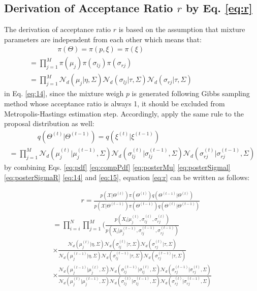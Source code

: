 \documentclass[conference]{IEEEtran}
\begin{document}
\subsection{Derivation of Acceptance Ratio $r$ by Eq. \eqref{eq:r}}
The derivation of acceptance ratio $r$ is based on the assumption that mixture parameters are independent from each other which means that:
\bigskip
\begin{multline}
\qquad\qquad\pi(\Theta) = \pi(p,\xi) = \pi(\xi) \\
= \prod_{j=1}^M\pi(\mu_j)\pi(\sigma_{lj})\pi(\sigma_{rj}) \qquad\qquad\qquad\qquad\qquad\\
= \prod_{j=1}^M\mathcal{N}_d(\mu_j|\eta,\Sigma)\mathcal{N}_d(\sigma_{lj}|\tau,\Sigma)\mathcal{N}_d(\sigma_{rj}|\tau,\Sigma)\qquad\qquad\qquad
\label{eq:14}
\end{multline}
in Eq. \eqref{eq:14}, since the mixture weigh $p$ is generated following Gibbs sampling method whose acceptance ratio is always 1, it should be excluded from Metropolis-Hastings estimation step. Accordingly, apply the same rule to the proposal distribution as well:
\begin{multline}
\qquad\qquad q(\Theta^{(t)}|\Theta^{(t-1)}) = q(\xi^{(t)}|\xi^{(t-1)}) \\
= \prod_{j=1}^M\mathcal{N}_d(\mu_j^{(t)}|\mu_j^{(t-1)},\Sigma)\mathcal{N}_d(\sigma_{lj}^{(t)}|\sigma_{lj}^{(t-1)},\Sigma)\mathcal{N}_d(\sigma_{rj}^{(t)}|\sigma_{rj}^{(t-1)},\Sigma)
\label{eq:15}
\end{multline}
by combining Eqs. \eqref{eq:pdf} \eqref{eq:compPdf} \eqref{eq:posterMu} \eqref{eq:posterSigmal} \eqref{eq:posterSigmaR} \eqref{eq:14} and \eqref{eq:15}, equation \eqref{eq:r} can be written as follows:

\begin{multline}
\qquad\qquad r = \frac{p(\mathcal{X}|\Theta^{(t)})\pi(\Theta^{(t)})q(\Theta^{(t-1)}|\Theta^{(t)})}{p(\mathcal{X}|\Theta^{(t-1)})\pi(\Theta^{(t-1)})q(\Theta^{(t)}|\Theta^{(t-1)})} \\
= \prod_{i=i}^N \prod_{j=1}^M(\frac{p(X_i|\mu_j^{(t)},\sigma_{lj}^{(t)},\sigma_{rj}^{(t)})}
{p(X_i|\mu_j^{(t-1)},\sigma_{lj}^{(t-1)},\sigma_{rj}^{(t-1)})} \qquad\qquad\\
\times \frac{\mathcal{N}_d(\mu_j^{(t)}|\eta,\Sigma)\mathcal{N}_d(\sigma_{lj}^{(t)}|\tau,\Sigma)\mathcal{N}_d(\sigma_{rj}^{(t)}|\tau,\Sigma)}{\mathcal{N}_d(\mu_j^{(t-1)}|\eta,\Sigma)\mathcal{N}_d(\sigma_{lj}^{(t-1)}|\tau,\Sigma)\mathcal{N}_d(\sigma_{rj}^{(t-1)}|\tau,\Sigma)} \\
\times \frac{\mathcal{N}_d(\mu_j^{(t-1)}|\mu_j^{(t)},\Sigma)\mathcal{N}_d(\sigma_{lj}^{(t-1)}|\sigma_{lj}^{(t)},\Sigma)\mathcal{N}_d(\sigma_{rj}^{(t-1)}|\sigma_{rj}^{(t)},\Sigma)}{\mathcal{N}_d(\mu_j^{(t)}|\mu_j^{(t-1)},\Sigma)\mathcal{N}_d(\sigma_{lj}^{(t)}|\sigma_{lj}^{(t-1)},\Sigma)\mathcal{N}_d(\sigma_{rj}^{(t)}|\sigma_{rj}^{(t-1)},\Sigma)}
\label{eq:16}
\end{multline}
\end{document}
